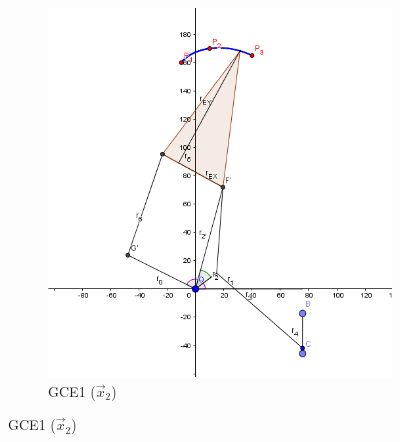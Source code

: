 \begin{figure}[p]
\begin{subfigure}[b]{0.45\linewidth}
	\includegraphics[width=\linewidth]{Figures/GCE1_2}
	\caption{GCE1  ($\vec{x}_2$)} \label{fig:G1} 
\end{subfigure}
	

\end{figure}
